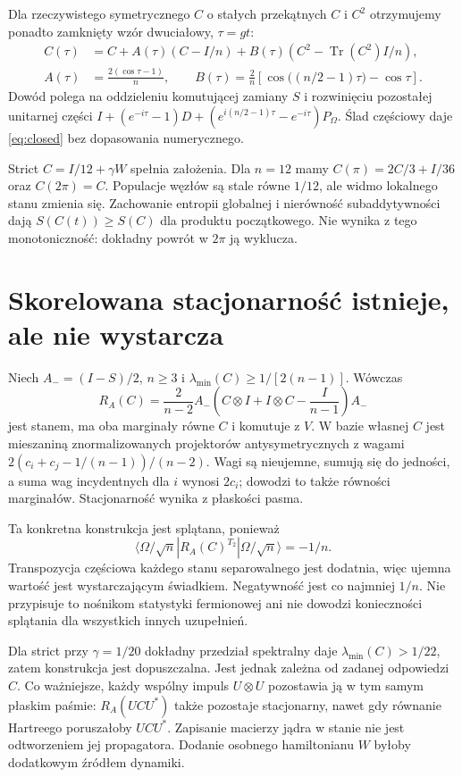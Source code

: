 \documentclass[11pt,a4paper]{article}
\newcommand{\Tr}{\operatorname{Tr}}
\begin{document}
Dla rzeczywistego symetrycznego $C$ o stałych przekątnych $C$ i $C^2$
otrzymujemy ponadto zamknięty wzór dwuciałowy, $\tau=gt$:
\begin{align}\label{eq:closed}
 C(\tau)&=C+A(\tau)(C-I/n)
       +B(\tau)(C^2-\Tr(C^2)I/n),\\
 A(\tau)&=\frac{2(\cos\tau-1)}n,\qquad
 B(\tau)=\frac2n\left[\cos\bigl((n/2-1)\tau\bigr)-\cos\tau\right].
\end{align}
Dowód polega na oddzieleniu komutującej zamiany $S$ i rozwinięciu
pozostałej unitarnej części
$I+(e^{-i\tau}-1)D+(e^{i(n/2-1)\tau}-e^{-i\tau})P_\Omega$.
Ślad częściowy daje \eqref{eq:closed} bez dopasowania numerycznego.

Strict $C=I/12+\gamma W$ spełnia założenia. Dla $n=12$ mamy
$C(\pi)=2C/3+I/36$ oraz $C(2\pi)=C$.
Populacje węzłów są stale równe $1/12$, ale widmo lokalnego stanu
zmienia się. Zachowanie entropii globalnej i nierówność subaddytywności
dają $S(C(t))\ge S(C)$ dla produktu początkowego. Nie wynika z tego
monotoniczność: dokładny powrót w $2\pi$ ją wyklucza.

\section{Skorelowana stacjonarność istnieje, ale nie wystarcza}

Niech $A_-=(I-S)/2$, $n\ge3$ i
$\lambda_{\min}(C)\ge1/[2(n-1)]$. Wówczas
\begin{equation}\label{eq:anti}
 R_A(C)=\frac2{n-2}A_-
 \left(C\otimes I+I\otimes C-\frac I{n-1}\right)A_-
\end{equation}
jest stanem, ma oba marginały równe $C$ i komutuje z $V$.
W bazie własnej $C$ jest mieszaniną znormalizowanych projektorów
antysymetrycznych z wagami
$2(c_i+c_j-1/(n-1))/(n-2)$. Wagi są nieujemne, sumują się do jedności,
a suma wag incydentnych dla $i$ wynosi $2c_i$; dowodzi to także
równości marginałów. Stacjonarność wynika z płaskości pasma.

Ta konkretna konstrukcja jest splątana, ponieważ
\[
 \langle\Omega/\sqrt n|R_A(C)^{T_2}|\Omega/\sqrt n\rangle=-1/n.
\]
Transpozycja częściowa każdego stanu separowalnego jest dodatnia,
więc ujemna wartość jest wystarczającym świadkiem. Negatywność jest
co najmniej $1/n$. Nie przypisuje to nośnikom statystyki fermionowej
ani nie dowodzi konieczności splątania dla wszystkich innych uzupełnień.

Dla strict przy $\gamma=1/20$ dokładny przedział spektralny daje
$\lambda_{\min}(C)>1/22$, zatem konstrukcja jest dopuszczalna.
Jest jednak zależna od zadanej odpowiedzi $C$. Co ważniejsze,
każdy wspólny impuls $U\otimes U$ pozostawia ją w tym samym płaskim
paśmie: $R_A(UCU^*)$ także pozostaje stacjonarny, nawet gdy równanie
Hartreego poruszałoby $UCU^*$.
Zapisanie macierzy jądra w stanie nie jest odtworzeniem jej propagatora.
Dodanie osobnego hamiltonianu $W$ byłoby dodatkowym źródłem dynamiki.
\end{document}
